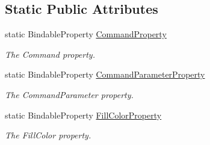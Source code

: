 \subsection*{Static Public Attributes}
\begin{DoxyCompactItemize}
\item 
static Bindable\+Property \mbox{\hyperlink{class_tutor_scout24_1_1_controls_1_1_circular_button_control_a5ca42d339eb31dac2600ce8519027d69}{Command\+Property}}
\begin{DoxyCompactList}\small\item\em The Command property. \end{DoxyCompactList}\item 
static Bindable\+Property \mbox{\hyperlink{class_tutor_scout24_1_1_controls_1_1_circular_button_control_a9040b2ab26fe89494eb1d6a9faffec2b}{Command\+Parameter\+Property}}
\begin{DoxyCompactList}\small\item\em The Command\+Parameter property. \end{DoxyCompactList}\item 
static Bindable\+Property \mbox{\hyperlink{class_tutor_scout24_1_1_controls_1_1_circular_button_control_a63f2f56f7c88dd4a1f01d5affcbe1b09}{Fill\+Color\+Property}}
\begin{DoxyCompactList}\small\item\em The Fill\+Color property. \end{DoxyCompactList}\end{DoxyCompactItemize}
